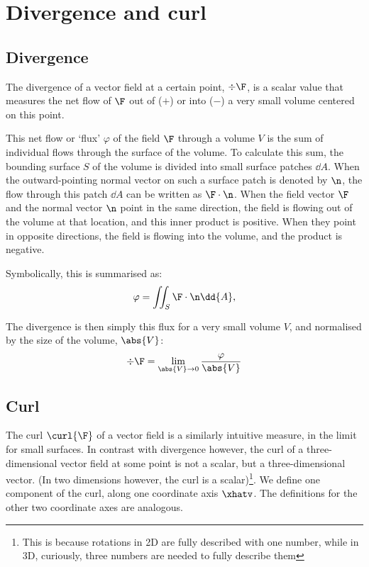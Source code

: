 \section{Divergence and curl}
\label{sec:div_curl}

\subsection{Divergence}

The divergence of a vector field at a certain point, $\div{\F}$, is a scalar
value that measures the net flow of $\F$ out of ($+$) or into ($-$) a very
small volume centered on this point.

This net flow or `flux' $\varphi$ of the field $\F$ through a volume $V$ is
the sum of individual flows through the surface of the volume. To calculate
this sum, the bounding surface $S$ of the volume is divided into small
surface patches $\dd{A}$. When the outward-pointing normal vector on such a
surface patch is denoted by $\n$, the flow through this patch $\dd{A}$ can be
written as $\F \cdot \n$. When the field vector $\F$ and the normal vector
$\n$ point in the same direction, the field is flowing out of the volume at
that location, and this inner product is positive. When they point in
opposite directions, the field is flowing into the volume, and the product is
negative.

Symbolically, this is summarised as:
\[
\varphi = \iint_S{\F \cdot \n \dd{A}},
\]

The divergence is then simply this flux for a very small volume $V$, and
normalised by the size of the volume, $\abs{V}$:
\[
\div{\F} = \lim_{\abs{V} \to 0}{\frac{\varphi}{\abs{V}}}
\]


\subsection{Curl}

The curl $\curl{\F}$ of a vector field is a similarly intuitive measure, in
the limit for small surfaces. In contrast with divergence however, the curl
of a three-dimensional vector field at some point is not a scalar, but a
three-dimensional vector. (In two dimensions however, the curl is a
scalar)\footnote{This is because rotations in 2D are fully described with one
number, while in 3D, curiously, three numbers are needed to fully describe
them}. We define one component of the curl, along one coordinate axis
$\xhatv$. The definitions for the other two coordinate axes are analogous.

